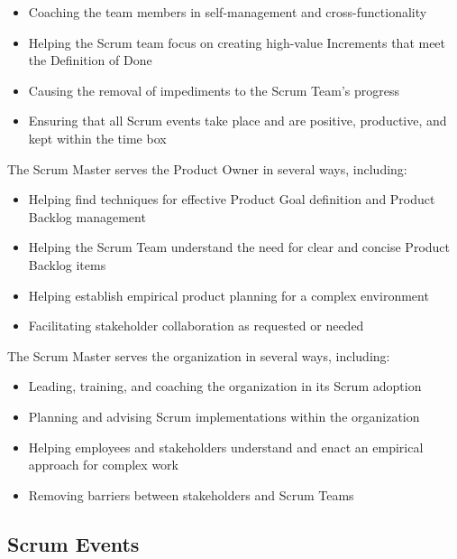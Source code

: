 \begin{itemize}
	\item Coaching the team members in self-management and cross-functionality
	\item Helping the Scrum team focus on creating high-value Increments that meet the Definition of Done
	\item Causing the removal of impediments to the Scrum Team's progress
	\item Ensuring that all Scrum events take place and are positive, productive, and kept within the time box
\end{itemize}

\begin{flushleft}
	The Scrum Master serves the Product Owner in several ways, including:
\end{flushleft}

\begin{itemize}
	\item Helping find techniques for effective Product Goal definition and Product Backlog management
	\item Helping the Scrum Team understand the need for clear and concise Product Backlog items
	\item Helping establish empirical product planning for a complex environment
	\item Facilitating stakeholder collaboration as requested or needed
\end{itemize}

\begin{flushleft}
	The Scrum Master serves the organization in several ways, including:
\end{flushleft}

\begin{itemize}
	\item Leading, training, and coaching the organization in its Scrum adoption
	\item Planning and advising Scrum implementations within the organization
	\item Helping employees and stakeholders understand and enact an empirical approach for complex work
	\item Removing barriers between stakeholders and Scrum Teams
\end{itemize}

\subsection{Scrum Events}\label{scrum-events}


